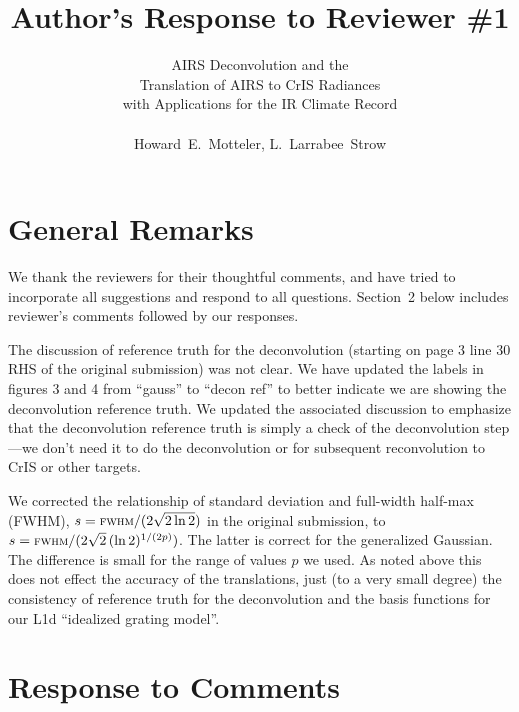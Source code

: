 \documentclass[11pt]{article}
\begin{document}
\title{Author's Response to Reviewer \#1 }

\author{AIRS Deconvolution and the \\
       Translation of AIRS to CrIS Radiances \\ 
       with Applications for the IR Climate Record \\
       \\
       Howard~E.~Motteler, L.~Larrabee~Strow}

\maketitle

\section{General Remarks}

We thank the reviewers for their thoughtful comments, and have 
tried to incorporate all suggestions and respond to all questions.
Section~2 below includes reviewer's comments followed by our
responses.

The discussion of reference truth for the deconvolution (starting on
page 3 line 30 RHS of the original submission) was not clear.  We
have updated the labels in figures 3 and 4 from ``gauss'' to ``decon
ref'' to better indicate we are showing the deconvolution reference
truth.  We updated the associated discussion to emphasize that the
deconvolution reference truth is simply a check of the deconvolution
step---we don't need it to do the deconvolution or for subsequent
reconvolution to CrIS or other targets.

We corrected the relationship of standard deviation and full-width
half-max (FWHM), $s=\mbox{\small\textsc{fwhm}} / (2\sqrt{2\ln 2})$ in the original
submission, to $s=\mbox{\small\textsc{fwhm}} / (2\sqrt{2}\,(\ln 2)^{1/(2p)})$.  The
latter is correct for the generalized Gaussian.  The difference is
small for the range of values $p$ we used.  As noted above this does
not effect the accuracy of the translations, just (to a very small
degree) the consistency of reference truth for the deconvolution and
the basis functions for our L1d ``idealized grating model''.

\section{Response to Comments}
\end{document}
